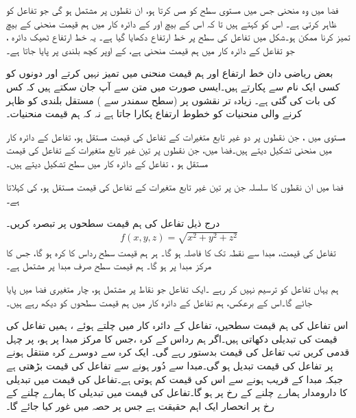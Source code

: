 فضا میں وہ منحنی جس میں  مستوی   سطح  کو مس کرتا ہو،  ان نقطوں پر مشتمل ہو گی  جو تفاعل  کو ظاہر کرتی ہے۔ اس کو  کہتے ہیں تا کہ اس کے   بیچ  اور    کے دائرہ کار  میں  ہم قیمت منحنی کے بیچ  تمیز کرنا ممکن ہو۔شکل   میں تفاعل  کی سطح  پر  خط ارتفاع   دکھایا گیا ہے۔ یہ خط ارتفاع ٹھیک دائرہ  ، جو تفاعل کے دائرہ کار میں  ہم قیمت  منحنی  ہے، کے اوپر کچھ بلندی پر پایا جاتا ہے۔

 بعض ریاضی دان  خط ارتفاع اور  ہم قیمت  منحنی میں تمیز نہیں کرتے  اور دونوں کو کسی ایک نام سے پکارتے ہیں۔ایسی صورت میں   متن سے آپ جان سکتے ہیں کہ کس کی بات کی گئی ہے۔ زیادہ تر نقشوں   پر  (سطح سمندر سے )   مستقل بلندی کو ظاہر کرنے والی منحنیات کو  خطوط  ارتفاع  پکارا جاتا ہے نہ  کہ  ہم قیمت  منحنیات۔

مستوی  میں ، جن نقطوں پر   دو غیر تابع  متغیرات کے  تفاعل  کی قیمت  مستقل  ہو،    تفاعل کے دائرہ کار میں    منحنی تشکیل دیتے ہیں۔فضا میں،   جن نقطوں پر تین غیر تابع متغیرات کے تفاعل کی قیمت  مستقل   ہو ،  تفاعل کے دائرہ کار میں    سطح تشکیل دیتے ہیں۔

فضا میں ان نقطوں    کا سلسلہ جن پر تین غیر تابع متغیرات کے تفاعل کی قیمت  مستقل  ہو،  کی  کہلاتا ہے۔

درج ذیل تفاعل کی  ہم قیمت  سطحوں پر تبصرہ کریں۔
\begin{align*}
f(x,y,z)=\sqrt{x^2+y^2+z^2}
\end{align*}
تفاعل  کی قیمت،   مبدا سے نقطہ  تک کا  فاصلہ   ہو گا۔ ہر  ہم قیمت  سطح  رداس  کا کرہ ہو گا،  جس کا مرکز مبدا پر ہو گا۔   ہم قیمت  سطح   صرف مبدا پر مشتمل ہے۔

ہم یہاں تفاعل کو ترسیم نہیں کر رہے  ۔ایک تفاعل جو نقاط   پر مشتمل ہو،  چار متغیری فضا  میں پایا جائے گا۔اس کے برعکس، ہم تفاعل کے دائرہ کار میں  ہم قیمت  سطحوں کو دیکھ رہے ہیں۔

 اس تفاعل کی  ہم قیمت  سطحیں، تفاعل کے دائرہ کار  میں  چلتے ہوئے ، ہمیں تفاعل کی قیمت کی تبدیلی  دکھاتی ہیں۔اگر ہم رداس  کے کرہ ،جس کا مرکز مبدا پر ہو،   پر چہل قدمی  کریں  تب تفاعل کی قیمت بدستور  رہے گی۔ ایک کرہ سے دوسرے کرہ  منتقل ہونے پر تفاعل کی قیمت تبدیل ہو گی۔مبدا سے دُور ہونے سے     تفاعل کی قیمت بڑھتی ہے جبکہ مبدا کے قریب ہونے سے اس کی قیمت کم ہوتی ہے۔تفاعل کی قیمت میں تبدیلی کا دارومدار ہمارے چلنے کے رخ پر ہو گا۔تفاعل کی قیمت میں تبدیلی کا  ہمارے چلنے کے رخ پر انحصار ایک اہم حقیقت ہے جس پر حصہ  میں غور کیا جائے گا۔ 

